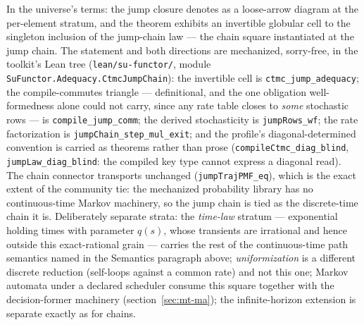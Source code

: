In the universe's terms: the jump closure denotes as a loose-arrow
diagram at the per-element stratum, and the theorem exhibits an
invertible globular cell to the singleton inclusion of the jump-chain
law --- the chain square instantiated at the jump chain.  The
statement and both directions are mechanized, sorry-free, in the
toolkit's Lean tree (\texttt{lean/su-functor/}, module
\texttt{SuFunctor.Adequacy.CtmcJumpChain}): the invertible cell is
\texttt{ctmc\_jump\_adequacy}; the compile-commutes triangle ---
definitional, and the one obligation well-formedness alone could not
carry, since any rate table closes to \emph{some} stochastic rows ---
is \texttt{compile\_jump\_comm}; the derived stochasticity is
\texttt{jumpRows\_wf}; the rate factorization is
\texttt{jumpChain\_step\_mul\_exit}; and the profile's
diagonal-determined convention is carried as theorems rather than
prose (\texttt{compileCtmc\_diag\_blind},
\texttt{jumpLaw\_diag\_blind}: the compiled key type cannot express a
diagonal read).  The chain connector transports unchanged
(\texttt{jumpTrajPMF\_eq}), which is the exact extent of the
community tie: the mechanized probability library has no
continuous-time Markov machinery, so the jump chain is tied as the
discrete-time chain it is.  Deliberately separate strata: the
\emph{time-law} stratum --- exponential holding times with parameter
$q(s)$, whose transients are irrational and hence outside this
exact-rational grain --- carries the rest of the continuous-time path
semantics named in the Semantics paragraph above;
\emph{uniformization} is a different discrete reduction (self-loops
against a common rate) and not this one; Markov automata under a
declared scheduler consume this square together with the
decision-former machinery (section~\ref{sec:mt-ma}); the
infinite-horizon extension is separate exactly as for chains.


